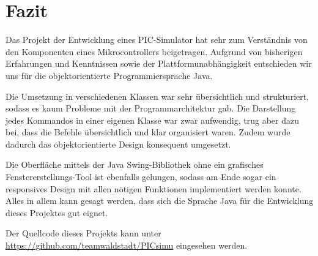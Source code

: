 \chapter{Fazit}

Das Projekt der Entwicklung eines PIC-Simulator hat sehr zum Verständnis von den Komponenten eines Mikrocontrollers beigetragen. Aufgrund von bisherigen Erfahrungen und Kenntnissen sowie der Plattformunabhängigkeit entschieden wir uns für die objektorientierte Programmiersprache Java.

Die Umsetzung in verschiedenen Klassen war sehr übersichtlich und strukturiert, sodass es kaum Probleme mit der Programmarchitektur gab. Die Darstellung jedes Kommandos in einer eigenen Klasse war zwar aufwendig, trug aber dazu bei, dass die Befehle übersichtlich und klar organisiert waren. Zudem wurde dadurch das objektorientierte Design konsequent umgesetzt.

Die Oberfläche mittels der Java Swing-Bibliothek ohne ein grafisches Fenstererstellungs-Tool ist ebenfalls gelungen, sodass am Ende sogar ein responsives Design mit allen nötigen Funktionen implementiert werden konnte. Alles in allem kann gesagt werden, dass sich die Sprache Java für die Entwicklung dieses Projektes gut eignet.

Der Quellcode dieses Projekts kann unter \href{https://github.com/teamwaldstadt/PICsimu/}{https://github.com/teamwaldstadt/PICsimu} eingesehen werden.
